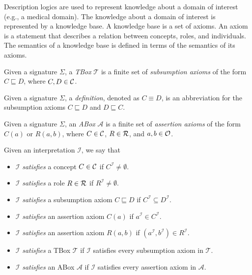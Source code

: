 Description logics are used to represent knowledge about a domain of interest (e.g., a medical domain).
The knowledge about a domain of interest is represented by a knowledge base.
A knowledge base is a set of axioms.
An axiom is a statement that describes a relation between concepts, roles, and individuals.
The semantics of a knowledge base is defined in terms of the semantics of its axioms.

\begin{definition}
    Given a signature $\Sigma$, a \emph{TBox} $\mathcal{T}$ is a finite set of \emph{subsumption axioms} of the form $C \sqsubseteq D$,
    where $C, D \in \mathcal{C}$.
\end{definition}

\begin{notation}[Definition]
    Given a signature $\Sigma$, a \emph{definition}, denoted as $C \equiv D$, is an abbreviation
    for the subsumption axioms $C \sqsubseteq D$ and $D \sqsubseteq C$.
\end{notation} 

\begin{definition}
    Given a signature $\Sigma$, an \emph{ABox} $\mathcal{A}$ is a finite set of \emph{assertion axioms} of the form $C(a)$ or $R(a, b)$,
    where $C \in \mathcal{C}$, $R \in \mathcal{R}$, and $a, b \in \mathcal{O}$.
\end{definition}

\begin{definition}[Satisfiability]
    Given an interpretation $\mathcal{I}$, we say that
    \begin{itemize}
        \item $\mathcal{I}$ \emph{satisfies} a concept $C \in \mathcal{C}$ if $C^\mathcal{I} \neq \emptyset$.
        \item $\mathcal{I}$ \emph{satisfies} a role $R \in \mathcal{R}$ if $R^\mathcal{I} \neq \emptyset$.
        \item $\mathcal{I}$ \emph{satisfies} a subsumption axiom $C \sqsubseteq D$ if $C^\mathcal{I} \subseteq D^\mathcal{I}$.
        \item $\mathcal{I}$ \emph{satisfies} an assertion axiom $C(a)$ if $a^\mathcal{I} \in C^\mathcal{I}$.
        \item $\mathcal{I}$ \emph{satisfies} an assertion axiom $R(a, b)$ if $(a^\mathcal{I}, b^\mathcal{I}) \in R^\mathcal{I}$.
        \item $\mathcal{I}$ \emph{satisfies} a TBox $\mathcal{T}$ if $\mathcal{I}$ satisfies every subsumption axiom in $\mathcal{T}$.
        \item $\mathcal{I}$ \emph{satisfies} an ABox $\mathcal{A}$ if $\mathcal{I}$ satisfies every assertion axiom in $\mathcal{A}$.
    \end{itemize}
\end{definition}

